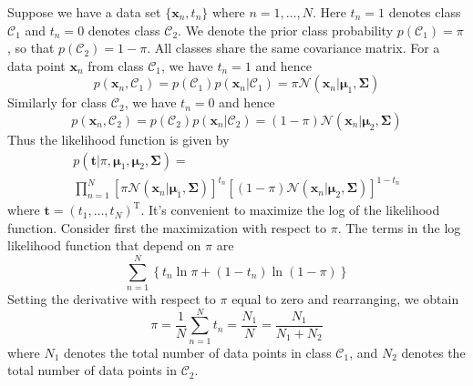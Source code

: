\documentclass[5p,sort&compress]{elsarticle}
\begin{document}
Suppose we have a data set $\{\mathbf{x}_n, t_n\}$ where $n = 1, \ldots, N$. Here $t_n = 1$ denotes class $\mathcal{C}_1$ and $t_n=0$ denotes class $\mathcal{C}_2$. We denote the prior class probability $p(\mathcal{C}_1) = \pi$, so that $p(\mathcal{C}_2) = 1 - \pi$. All classes share the same covariance matrix. For a data point $\mathbf{x}_n$ from class $\mathcal{C}_1$, we have $t_n = 1$ and hence
\begin{equation}
p\left(\mathbf{x}_{n}, \mathcal{C}_{1}\right)=p\left(\mathcal{C}_{1}\right) p\left(\mathbf{x}_{n} | \mathcal{C}_{1}\right)=\pi \mathcal{N}\left(\mathbf{x}_{n} | \boldsymbol{\mu}_{1}, \mathbf{\Sigma}\right)
\end{equation}
Similarly for class $\mathcal{C}_2$, we have $t_n = 0$ and hence
\begin{equation}
p\left(\mathbf{x}_{n}, \mathcal{C}_{2}\right)=p\left(\mathcal{C}_{2}\right) p\left(\mathbf{x}_{n} | \mathcal{C}_{2}\right)=(1-\pi) \mathcal{N}\left(\mathbf{x}_{n} | \boldsymbol{\mu}_{2}, \mathbf{\Sigma}\right)
\end{equation}
Thus the likelihood function is given by 
\begin{equation}
\begin{aligned}
p\left(\mathbf{t} | \pi, \boldsymbol{\mu}_{1}, \boldsymbol{\mu}_{2}, \boldsymbol{\Sigma}\right)= \\
\prod_{n=1}^{N}\left[\pi \mathcal{N}\left(\mathbf{x}_{n} | \boldsymbol{\mu}_{1}, \mathbf{\Sigma}\right)\right]^{t_{n}}\left[(1-\pi) \mathcal{N}\left(\mathbf{x}_{n} | \boldsymbol{\mu}_{2}, \mathbf{\Sigma}\right)\right]^{1-t_{n}}
\end{aligned}
\end{equation}
where $\mathbf{t} = (t_1, \ldots, t_N)^{\mathrm{T}}$. It's convenient to maximize the log of the likelihood function. Consider first the maximization with respect to $\pi$. The terms in the log likelihood function that depend on $\pi$ are
\begin{equation}
\sum_{n=1}^{N}\left\{t_{n} \ln \pi+\left(1-t_{n}\right) \ln (1-\pi)\right\}
\end{equation}
Setting the derivative with respect to $\pi$ equal to zero and rearranging, we obtain
\begin{equation}
\pi=\frac{1}{N} \sum_{n=1}^{N} t_{n}=\frac{N_{1}}{N}=\frac{N_{1}}{N_{1}+N_{2}}
\end{equation}
where $N_1$ denotes the total number of data points in class $\mathcal{C}_1$, and $N_2$ denotes the total number of data points in $\mathcal{C}_2$.
\end{document}
